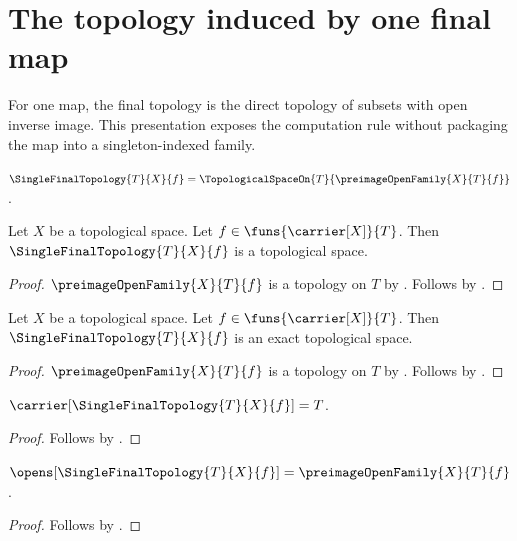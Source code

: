 \section{The topology induced by one final map}



For one map, the final topology is the direct topology of subsets with open
inverse image.  This presentation exposes the computation rule without
packaging the map into a singleton-indexed family.

\begin{definition}\label{single_final_topology}
    $\SingleFinalTopology{T}{X}{f}
        =\TopologicalSpaceOn{T}{\preimageOpenFamily{X}{T}{f}}$.
\end{definition}

\begin{theorem}\label{single_final_topology_is_topological_space}
    Let $X$ be a topological space.
    Let $f\in\funs{\carrier[X]}{T}$.
    Then $\SingleFinalTopology{T}{X}{f}$ is a topological space.
\end{theorem}
\begin{proof}
    $\preimageOpenFamily{X}{T}{f}$ is a topology on $T$ by
        .
    Follows by
        .
\end{proof}

\begin{theorem}\label{single_final_topology_is_exact}
    Let $X$ be a topological space.
    Let $f\in\funs{\carrier[X]}{T}$.
    Then $\SingleFinalTopology{T}{X}{f}$ is an exact topological space.
\end{theorem}
\begin{proof}
    $\preimageOpenFamily{X}{T}{f}$ is a topology on $T$ by
        .
    Follows by
        .
\end{proof}

\begin{proposition}\label{single_final_topology_carrier}
    $\carrier[\SingleFinalTopology{T}{X}{f}]=T$.
\end{proposition}
\begin{proof}
    Follows by
        .
\end{proof}

\begin{proposition}\label{single_final_topology_opens}
    $\opens[\SingleFinalTopology{T}{X}{f}]
        =\preimageOpenFamily{X}{T}{f}$.
\end{proposition}
\begin{proof}
    Follows by
        .
\end{proof}

